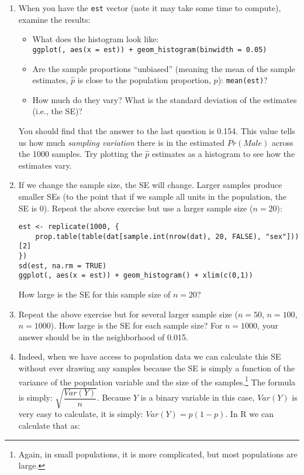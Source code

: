 \documentclass[a4paper,12pt]{article}
\begin{document}
\begin{enumerate}
\item When you have the \texttt{est} vector (note it may take some time to compute), examine the results:

\begin{itemize}
\item What does the histogram look like:\\ \texttt{ggplot(, aes(x = est)) + geom\_histogram(binwidth = 0.05)}
\item Are the sample proportions ``unbiased'' (meaning the mean of the sample estimates, $\hat{p}$ is close to the population proportion, $p$): \texttt{mean(est)}?
\item How much do they vary? What is the standard deviation of the estimates (i.e., the SE)? 
\end{itemize}

\noindent You should find that the answer to the last question is 0.154. This value tells us how much \textit{sampling variation} there is in the estimated $Pr(Male)$ across the 1000 samples. Try plotting the $\hat{p}$ estimates as a histogram to see how the estimates vary.

\item If we change the sample size, the SE will change. Larger samples produce smaller SEs (to the point that if we sample all units in the population, the SE is 0). Repeat the above exercise but use a larger sample size ($n=20$):

\begin{verbatim}
est <- replicate(1000, {
    prop.table(table(dat[sample.int(nrow(dat), 20, FALSE), "sex"]))[2]
})
sd(est, na.rm = TRUE)
ggplot(, aes(x = est)) + geom_histogram() + xlim(c(0,1))
\end{verbatim}

\noindent How large is the SE for this sample size of $n=20$?

\item Repeat the above exercise but for several larger sample size ($n=50$, $n=100$, $n=1000$). How large is the SE for each sample size? For $n=1000$, your answer should be in the neighborhood of 0.015.

\item Indeed, when we have access to population data we can calculate this SE without ever drawing any samples because the SE is simply a function of the variance of the population variable and the size of the samples.\footnote{Again, in small populations, it is more complicated, but most populations are large.} The formula is simply: $\sqrt{\dfrac{Var(Y)}{n}}$. Because $Y$ is a binary variable in this case, $Var(Y)$ is very easy to calculate, it is simply: $Var(Y) = p(1-p)$. In R we can calculate that as:


\end{enumerate}
\end{document}
